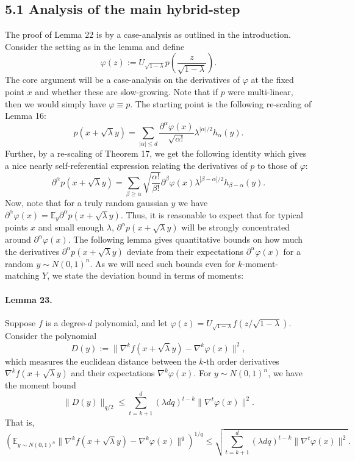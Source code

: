 \subsection*{5.1 Analysis of the main hybrid-step}
The proof of Lemma 22 is by a case-analysis as outlined in the introduction. Consider the setting as in the lemma and define
\[\varphi(z):=U_{\sqrt{1-\lambda}}p\left(\frac z{\sqrt{1-\lambda}}\right).\]
The core argument will be a case-analysis on the derivatives of $\varphi$ at the fixed point $x$ and whether these are slow-growing. Note that if $p$ were multi-linear, then we would simply have $\varphi\equiv p$. The starting point is the following re-scaling of Lemma 16:
\[p(x+\sqrt\lambda y)=\sum_{|\alpha|\leq d}\frac{\partial^\alpha\varphi(x)}{\sqrt{\alpha!}}\lambda^{|\alpha|/2}h_\alpha(y).\tag{4}\]
Further, by a re-scaling of Theorem 17, we get the following identity which gives a nice nearly self-referential expression relating the derivatives of $p$ to those of $\varphi$:
\[\partial^\alpha p(x+\sqrt\lambda y)=\sum_{\beta\geq\alpha}\sqrt{\frac{\alpha!}{\beta!}}\partial^\beta\varphi(x)\lambda^{|\beta-\alpha|/2}h_{\beta-\alpha}(y).\tag{5}\]
Now, note that for a truly random gaussian $y$ we have $\partial^\alpha\varphi(x)=\mathbb E_y\partial^\alpha p(x+\sqrt\lambda y)$. Thus, it is reasonable to expect that for typical points $x$ and small enough $\lambda$, $\partial^\alpha p(x+\sqrt\lambda y)$ will be strongly concentrated around $\partial^\alpha\varphi(x)$. The following lemma gives quantitative bounds on how much the derivatives $\partial^\alpha p(x+\sqrt\lambda y)$ deviate from their expectations $\partial^\alpha\varphi(x)$ for a random $y\sim N(0,1)^n$. As we will need such bounds even for $k$-moment-matching $Y$, we state the deviation bound in terms of moments:
\paragraph{Lemma 23.} Suppose $f$ is a degree-$d$ polynomial, and let $\varphi(z)=U_{\sqrt{1-\lambda}}f(z/\sqrt{1-\lambda})$. Consider the polynomial
\[D(y):=\|\nabla^kf(x+\sqrt\lambda y)-\nabla^k\varphi(x)\|^2,\]
which measures the euclidean distance between the $k$-th order derivatives $\nabla^kf(x+\sqrt\lambda y)$ and their expectations $\nabla^k\varphi(x)$. For $y\sim N(0,1)^n$, we have the moment bound
\[\|D(y)\|_{q/2}\leq\sum_{t=k+1}^d(\lambda dq)^{t-k}\|\nabla^t\varphi(x)\|^2.\]
That is,
\[\left(\mathbb E_{y\sim N(0,1)^n}\|\nabla^kf(x+\sqrt\lambda y)-\nabla^k\varphi(x)\|^q\right)^{1/q}\leq\sqrt{\sum_{t=k+1}^d(\lambda dq)^{t-k}\|\nabla^t\varphi(x)\|^2}.\]
